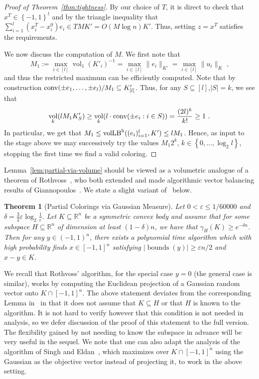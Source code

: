 \documentclass[11pt]{article}
\newtheorem{theorem}{Theorem}
\newcommand{\R}{{\mathbb{R}}}
\newcommand\eps{\varepsilon}
\newcommand{\set}[1]{\left\{ #1 \right\}}
\DeclareMathOperator{\vollb}{volLB}
\DeclareMathOperator{\vol}{vol}
\DeclareMathOperator{\bnds}{bounds}
\newcommand{\notename}[2]{{\textcolor{red}{{\bf (#1:} {#2}{\bf ) }}}}
\newcommand{\notename}[2]{{\textcolor{red}{\footnotesize{\bf (#1:} {#2}{\bf ) }}}}
\newcommand{\dnote}[1]{{\notename{Daniel}{#1}}}
\newcommand{\notename}[2]{{}}
\newcommand{\dnote}[1]{}
\begin{document}
\begin{proof}[Proof of Theorem~\ref{thm:tightness}]
By our choice of $T$, it is direct to check that $x^T \in \set{-1,1}^l$ and by
the triangle inequality that $\sum_{i=1}^l (x^T_i-x^0_i)e_i \in T M K' = O(M\log n) K'$. Thus, setting $z = x^T$ satisfies the requirements.

We now discuss the computation of $M$. We first note that 
\[
M_1 := \max_{i \in [l]} \vol_1(K'_i)^{-1} = \max_{i \in [l]} \|e_i\|_{K'} =
\max_{i \in [l]} \|u_i\|_K \text{ ,}
\]
and thus the restricted maximum can be efficiently computed. Note that by
construction ${\rm conv}(\pm e_1,\dots, \pm e_l)/M_1 \subseteq K'_{[l]}$. Thus,
for any $S \subseteq [l]$,$|S|=k$, we see that
\[
\vol_k(l M_1 K'_S) \geq \vol_{k}(l \cdot {\rm conv}(\pm e_i: i \in S)) = \frac{(2l)^k}{k!}
 \geq 1 \text{ .}
\]
In particular, we get that $M_1 \leq \vollb^{\rm h}((e_i)_{i=1}^l,K') \leq l M_1$.
Hence, as input to the stage above we may successively try the values $M_1
2^k$, $k \in \set{0,\dots,\log_2 l}$, stopping the first time we find a valid
coloring. 
\end{proof}

Lemma~\ref{lem:partial-via-volume} should be viewed as a volumetric analogue of
a theorem of Rothvoss~\cite{rothvoss-giann}, who both extended and made
algorithmic vector balancing results of Giannopoulos~\cite{giannop}. We state a
slight variant of~\cite[Lemma 9]{rothvoss-giann} below.


\begin{theorem}[Partial Colorings via Gaussian Measure]\label{thm:roth-giann}
Let $0 < \eps \leq 1/60000$ and $\delta = \frac{3}{2}\eps \log_2
\frac{1}{\eps}$. Let $K \subseteq \R^n$ be a symmetric convex body and assume
that for some subspace $H \subseteq \R^n$ of dimension at least $(1-\delta)n$,
we have that $\gamma_H(K) \geq e^{-\delta n}$. Then for any $y \in (-1,1)^n$,
there exists a polynomial time algorithm which with high probability finds $x
\in [-1,1]^n$ satisfying $|\bnds(y)| \geq \eps n/2$ and $x-y \in K$.
\end{theorem}

We recall that Rothvoss' algorithm, for the special case $y = 0$ (the general
case is similar), works by computing the Euclidean projection of a Gaussian
random vector onto $K \cap [-1,1]^n$. The above statement deviates from the
corresponding Lemma in~\cite{rothvoss-giann} in that it does not assume that $K
\subseteq H$ or that $H$ is known to the algorithm. It is not hard to verify
however that this condition is not needed in analysis, so we defer discussion of
the proof of this statement to the full version. The flexibility gained by not
needing to know the subspace in advance will be very useful in the sequel. We
note that one can also adapt the analysis of the algorithm of Singh and
Eldan~\cite{ES14}, which maximizes over $K \cap [-1,1]^n$ using the Gaussian as
the objective vector instead of projecting it, to work in the above setting.   
\end{document}
